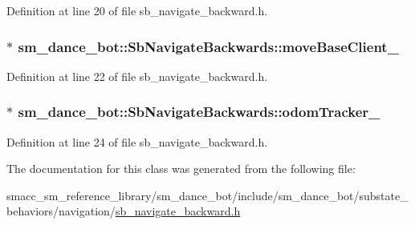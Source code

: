 Definition at line 20 of file sb\+\_\+navigate\+\_\+backward.\+h.

\subsubsection[{\texorpdfstring{move\+Base\+Client\+\_\+}{moveBaseClient_}}]{$\ast$ sm\+\_\+dance\+\_\+bot\+::\+Sb\+Navigate\+Backwards\+::move\+Base\+Client\+\_\+}\hypertarget{classsm__dance__bot_1_1SbNavigateBackwards_a363a6734c204d86d6e03b34f1bcfd9e1}{}\label{classsm__dance__bot_1_1SbNavigateBackwards_a363a6734c204d86d6e03b34f1bcfd9e1}


Definition at line 22 of file sb\+\_\+navigate\+\_\+backward.\+h.

\subsubsection[{\texorpdfstring{odom\+Tracker\+\_\+}{odomTracker_}}]{$\ast$ sm\+\_\+dance\+\_\+bot\+::\+Sb\+Navigate\+Backwards\+::odom\+Tracker\+\_\+}\hypertarget{classsm__dance__bot_1_1SbNavigateBackwards_a5e5d9dc660a33cfdfc48ade609bc69e9}{}\label{classsm__dance__bot_1_1SbNavigateBackwards_a5e5d9dc660a33cfdfc48ade609bc69e9}


Definition at line 24 of file sb\+\_\+navigate\+\_\+backward.\+h.



The documentation for this class was generated from the following file\+:\begin{DoxyCompactItemize}
\item 
smacc\+\_\+sm\+\_\+reference\+\_\+library/sm\+\_\+dance\+\_\+bot/include/sm\+\_\+dance\+\_\+bot/substate\+\_\+behaviors/navigation/\hyperlink{sb__navigate__backward_8h}{sb\+\_\+navigate\+\_\+backward.\+h}\end{DoxyCompactItemize}
